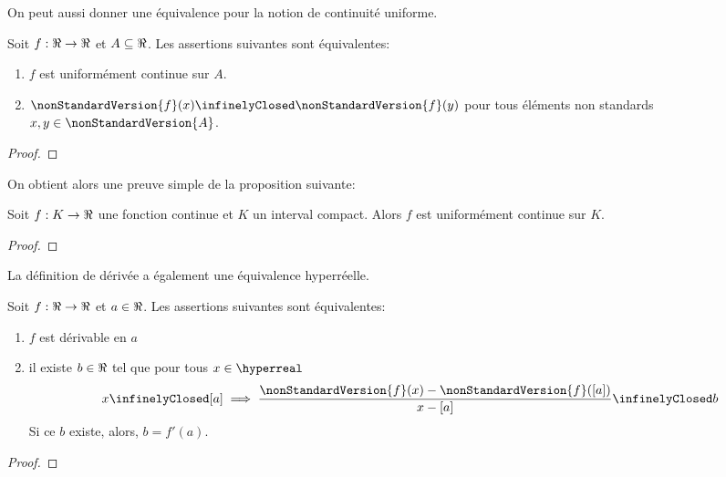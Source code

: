 On peut aussi donner une équivalence pour la notion de continuité uniforme.

\begin{proposition}
	Soit $f : \real \rightarrow \real$ et $A \subseteq \real$. Les assertions
	suivantes sont équivalentes:

	\begin{enumerate}
		\item $f$ est uniformément continue sur $A$.
		\item $\nonStandardVersion{f}(x) \infinelyClosed \nonStandardVersion{f}(y)$ pour tous éléments
			non standards $x, y \in \nonStandardVersion{A}$.
	\end{enumerate}
\end{proposition}

\ifdefined\outputproof
\begin{proof}

\end{proof}
\fi

On obtient alors une preuve simple de la proposition suivante:

\begin{proposition}
	Soit $f : K \rightarrow \real$ une fonction continue et $K$ un interval compact.
	Alors $f$ est uniformément continue sur $K$.
\end{proposition}

\ifdefined\outputproof
\begin{proof}

\end{proof}
\fi

La définition de dérivée a également une équivalence hyperréelle.

\begin{proposition}
	Soit $f : \real \rightarrow \real$ et $a \in \real$. Les assertions
	suivantes sont équivalentes:

	\begin{enumerate}
		\item $f$ est dérivable en $a$
		\item il existe $b \in \real$ tel que pour tous $x \in \hyperreal$
			\begin{equation}
				x \infinelyClosed [a] \implies \frac{\nonStandardVersion{f}(x) -
				\nonStandardVersion{f}([a])}{x - [a]} \infinelyClosed b
			\end{equation}
			Si ce $b$ existe, alors, $b = f'(a)$.
	\end{enumerate}
\end{proposition}

\ifdefined\outputproof
\begin{proof}

\end{proof}
\fi


